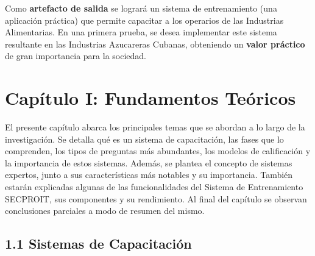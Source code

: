 \documentclass[12pt,a4paper]{report}
\begin{document}
Como \textbf{artefacto de salida} se logrará un sistema de entrenamiento (una aplicación práctica) que permite capacitar a los operarios de las Industrias Alimentarias. En una primera prueba, se desea implementar este sistema resultante en las Industrias Azucareras Cubanas, obteniendo un \textbf{valor práctico} de gran importancia para la sociedad.

\chapter*{Capítulo I: Fundamentos Teóricos}
El presente capítulo abarca los principales temas que se abordan a lo largo de la investigación. Se detalla qué es un sistema de capacitación, las fases que lo comprenden, los tipos de preguntas más abundantes, los modelos de calificación y la importancia de estos sistemas. Además, se plantea el concepto de sistemas expertos, junto a sus características más notables y su importancia. También estarán explicadas algunas de las funcionalidades del Sistema de Entrenamiento SECPROIT, sus componentes y su rendimiento.
Al final del capítulo se observan conclusiones parciales a modo de resumen del mismo.

\section*{1.1 Sistemas de Capacitación}


\nocite{*}


\end{document}
